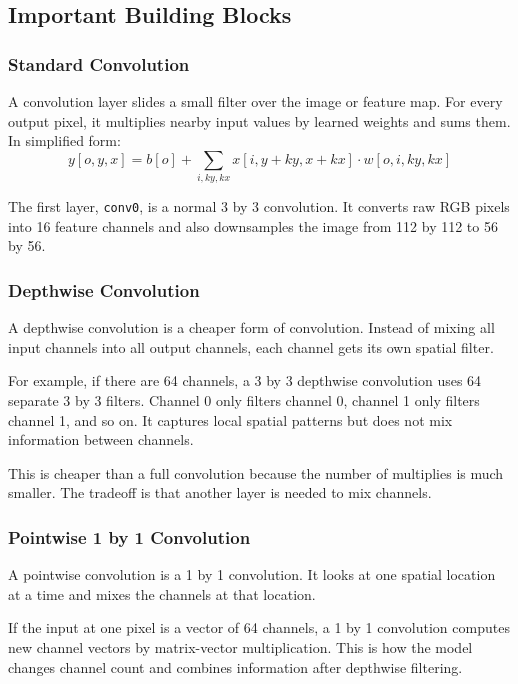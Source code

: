 \documentclass[11pt]{article}
\newcommand{\code}[1]{\texttt{#1}}
\begin{document}
\subsection{Important Building Blocks}

\subsubsection{Standard Convolution}

A convolution layer slides a small filter over the image or feature map.
For every output pixel, it multiplies nearby input values by learned weights and sums them.
In simplified form:
\[
  y[o,y,x] =
  b[o] + \sum_{i,ky,kx}
  x[i,y+ky,x+kx] \cdot w[o,i,ky,kx]
\]

The first layer, \code{conv0}, is a normal 3 by 3 convolution.
It converts raw RGB pixels into 16 feature channels and also downsamples the image from 112 by 112 to 56 by 56.

\subsubsection{Depthwise Convolution}

A depthwise convolution is a cheaper form of convolution.
Instead of mixing all input channels into all output channels, each channel gets its own spatial filter.

For example, if there are 64 channels, a 3 by 3 depthwise convolution uses 64 separate 3 by 3 filters.
Channel 0 only filters channel 0, channel 1 only filters channel 1, and so on.
It captures local spatial patterns but does not mix information between channels.

This is cheaper than a full convolution because the number of multiplies is much smaller.
The tradeoff is that another layer is needed to mix channels.

\subsubsection{Pointwise 1 by 1 Convolution}

A pointwise convolution is a 1 by 1 convolution.
It looks at one spatial location at a time and mixes the channels at that location.

If the input at one pixel is a vector of 64 channels, a 1 by 1 convolution computes new channel vectors by matrix-vector multiplication.
This is how the model changes channel count and combines information after depthwise filtering.
\end{document}
